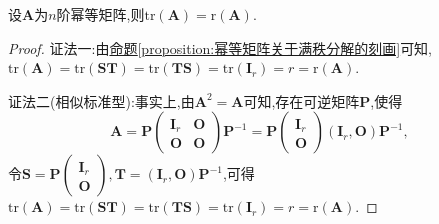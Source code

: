 \documentclass[../../main.tex]{subfiles}%
\begin{document}
\begin{corollary}[幂等矩阵的迹和秩相等]\label{corollary:幂等矩阵的迹和秩相等}
设\(\boldsymbol{A}\)为\(n\)阶幂等矩阵,则\(\mathrm{tr}(\boldsymbol{A})=\mathrm{r}(\boldsymbol{A})\).
\end{corollary}
\begin{proof}

{\color{blue}证法一:}由\hyperref[proposition:幂等矩阵关于满秩分解的刻画]{命题\ref{proposition:幂等矩阵关于满秩分解的刻画}}可知,\(\mathrm{tr}(\boldsymbol{A})=\mathrm{tr}(\boldsymbol{S}\boldsymbol{T})=\mathrm{tr}(\boldsymbol{T}\boldsymbol{S})=\mathrm{tr}(\boldsymbol{I}_r)=r=\mathrm{r}(\boldsymbol{A})\).

{\color{blue}证法二(相似标准型):}事实上,由\(\boldsymbol{A}^2=\boldsymbol{A}\)可知,存在可逆矩阵\(\boldsymbol{P}\),使得
\[
\boldsymbol{A}=\boldsymbol{P}\begin{pmatrix}
\boldsymbol{I}_r&\boldsymbol{O}\\
\boldsymbol{O}&\boldsymbol{O}
\end{pmatrix}\boldsymbol{P}^{-1}=\boldsymbol{P}\begin{pmatrix}
\boldsymbol{I}_r\\
\boldsymbol{O}
\end{pmatrix}(\boldsymbol{I}_r,\boldsymbol{O})\boldsymbol{P}^{-1},
\]
令\(\boldsymbol{S}=\boldsymbol{P}\begin{pmatrix}
\boldsymbol{I}_r\\
\boldsymbol{O}
\end{pmatrix},\boldsymbol{T}=(\boldsymbol{I}_r,\boldsymbol{O})\boldsymbol{P}^{-1}\),可得\(\mathrm{tr}(\boldsymbol{A})=\mathrm{tr}(\boldsymbol{S}\boldsymbol{T})=\mathrm{tr}(\boldsymbol{T}\boldsymbol{S})=\mathrm{tr}(\boldsymbol{I}_r)=r=\mathrm{r}(\boldsymbol{A})\).
\end{proof}
\end{document}
